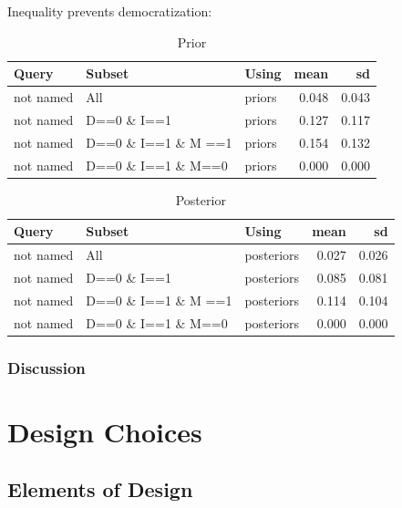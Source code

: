 \documentclass[12pt,]{book}
\begin{document}
Inequality prevents democratization:

\begin{table}[t]

\caption{\label{tab:unnamed-chunk-63}Prior}
\centering
\begin{tabular}{l|l|l|r|r}
\hline
Query & Subset & Using & mean & sd\\
\hline
not named & All & priors & 0.048 & 0.043\\
\hline
not named & D==0 \& I==1 & priors & 0.127 & 0.117\\
\hline
not named & D==0 \& I==1 \& M ==1 & priors & 0.154 & 0.132\\
\hline
not named & D==0 \& I==1 \& M==0 & priors & 0.000 & 0.000\\
\hline
\end{tabular}
\end{table}

\begin{table}[t]

\caption{\label{tab:unnamed-chunk-63}Posterior}
\centering
\begin{tabular}{l|l|l|r|r}
\hline
Query & Subset & Using & mean & sd\\
\hline
not named & All & posteriors & 0.027 & 0.026\\
\hline
not named & D==0 \& I==1 & posteriors & 0.085 & 0.081\\
\hline
not named & D==0 \& I==1 \& M ==1 & posteriors & 0.114 & 0.104\\
\hline
not named & D==0 \& I==1 \& M==0 & posteriors & 0.000 & 0.000\\
\hline
\end{tabular}
\end{table}

\hypertarget{discussion}{%
\section{Discussion}\label{discussion}}

\hypertarget{part-design-choices}{%
\part{Design Choices}\label{part-design-choices}}

\hypertarget{elements-of-design}{%
\chapter{Elements of Design}\label{elements-of-design}}
\end{document}
